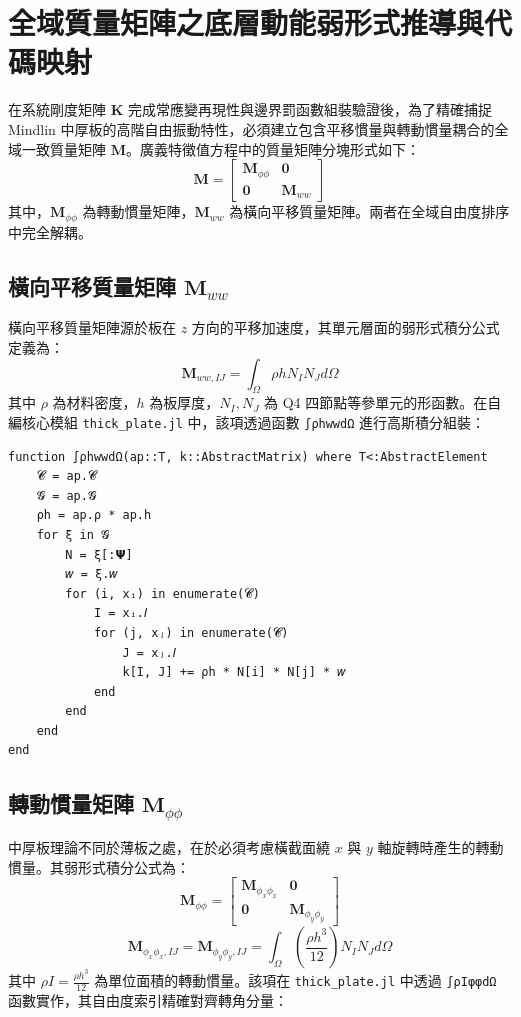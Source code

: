 \section{全域質量矩陣之底層動能弱形式推導與代碼映射}

在系統剛度矩陣 $\mathbf{K}$ 完成常應變再現性與邊界罰函數組裝驗證後，為了精確捕捉 Mindlin 中厚板的高階自由振動特性，必須建立包含平移慣量與轉動慣量耦合的全域一致質量矩陣 $\mathbf{M}$。廣義特徵值方程中的質量矩陣分塊形式如下：
\begin{equation}
\mathbf{M} = \begin{bmatrix} \mathbf{M}_{\phi\phi} & \mathbf{0} \\ \mathbf{0} & \mathbf{M}_{ww} \end{bmatrix}
\end{equation}
其中，$\mathbf{M}_{\phi\phi}$ 為轉動慣量矩陣，$\mathbf{M}_{ww}$ 為橫向平移質量矩陣。兩者在全域自由度排序中完全解耦。

\subsection{橫向平移質量矩陣 $\mathbf{M}_{ww}$}
橫向平移質量矩陣源於板在 $z$ 方向的平移加速度，其單元層面的弱形式積分公式定義為：
\begin{equation}
\mathbf{M}_{ww, IJ} = \int_{\Omega} \rho h N_I N_J d\Omega
\end{equation}
其中 $\rho$ 為材料密度，$h$ 為板厚度，$N_I, N_J$ 為 Q4 四節點等參單元的形函數。在自編核心模組 \texttt{thick\_plate.jl} 中，該項透過函數 \texttt{∫ρhwwdΩ} 進行高斯積分組裝：

\begin{lstlisting}[caption={thick\_plate.jl 中橫向平移質量矩陣 \texttt{∫ρhwwdΩ} 實作}]
function ∫ρhwwdΩ(ap::T, k::AbstractMatrix) where T<:AbstractElement
    𝓒 = ap.𝓒
    𝓖 = ap.𝓖
    ρh = ap.ρ * ap.h
    for ξ in 𝓖
        N = ξ[:𝝭]
        𝑤 = ξ.𝑤
        for (i, xᵢ) in enumerate(𝓒)
            I = xᵢ.𝐼
            for (j, xⱼ) in enumerate(𝓒)
                J = xⱼ.𝐼
                k[I, J] += ρh * N[i] * N[j] * 𝑤
            end
        end
    end
end
\end{lstlisting}

\subsection{轉動慣量矩陣 $\mathbf{M}_{\phi\phi}$}
中厚板理論不同於薄板之處，在於必須考慮橫截面繞 $x$ 與 $y$ 軸旋轉時產生的轉動慣量。其弱形式積分公式為：
\begin{equation}
\mathbf{M}_{\phi\phi} = \begin{bmatrix} \mathbf{M}_{\phi_x\phi_x} & \mathbf{0} \\ \mathbf{0} & \mathbf{M}_{\phi_y\phi_y} \end{bmatrix}
\end{equation}
\begin{equation}
\mathbf{M}_{\phi_x\phi_x, IJ} = \mathbf{M}_{\phi_y\phi_y, IJ} = \int_{\Omega} \left( \frac{\rho h^3}{12} \right) N_I N_J d\Omega
\end{equation}
其中 $\rho I = \frac{\rho h^3}{12}$ 為單位面積的轉動慣量。該項在 \texttt{thick\_plate.jl} 中透過 \texttt{∫ρIφφdΩ} 函數實作，其自由度索引精確對齊轉角分量：

